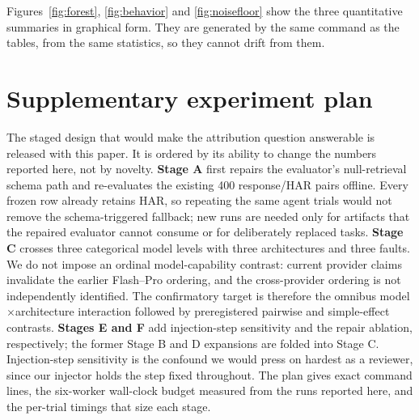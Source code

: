 Figures~\ref{fig:forest}, \ref{fig:behavior} and \ref{fig:noisefloor} show the
three quantitative summaries in graphical form. They are generated by the same
command as the tables, from the same statistics, so they cannot drift from them.





\section{Supplementary experiment plan}
\label{app:plan}

The staged design that would make the attribution question answerable is released
with this paper. It is ordered by its ability to change the numbers reported here,
not by novelty. \textbf{Stage A} first repairs the evaluator's null-retrieval
schema path and re-evaluates the existing 400 response/HAR pairs offline. Every
frozen row already retains HAR, so repeating the same agent trials would not
remove the schema-triggered fallback; new runs are needed only for artifacts that
the repaired evaluator cannot consume or for deliberately replaced tasks.
\textbf{Stage C} crosses three categorical model levels with three architectures
and three faults. We do not impose an ordinal model-capability contrast: current
provider claims invalidate the earlier Flash--Pro ordering, and the cross-provider
ordering is not independently identified. The confirmatory target is therefore
the omnibus model$\times$architecture interaction followed by preregistered
pairwise and simple-effect contrasts.
\textbf{Stages E and F} add injection-step sensitivity and the repair ablation,
respectively; the former Stage B and D expansions are folded into Stage C. Injection-step sensitivity is
the confound we would press on hardest as a reviewer, since our injector holds the
step fixed throughout. The plan gives exact command lines, the six-worker
wall-clock budget measured from the runs reported here, and the per-trial timings
that size each stage.
